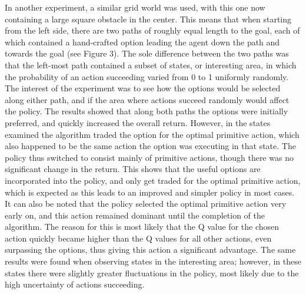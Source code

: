 \documentclass{acm_proc_article-sp}
\begin{document}
In another experiment, a similar grid world was used, with this one now containing a large square obstacle in the center. This means that when starting from the left side, there are two paths of roughly equal length to the goal, each of which contained a hand-crafted option leading the agent down the path and towards the goal (see Figure 3). The sole difference between the two paths was that the left-most path contained a subset of states, or interesting area, in which the probability of an action succeeding varied from 0 to 1 uniformly randomly.
	 The interest of the experiment was to see how the options would be selected along either path, and if the area where actions succeed randomly would affect the policy. The results showed that along both paths the options were initially preferred, and quickly increased the overall return. 
	 However, in the states examined the algorithm traded the option for the optimal primitive action, which also happened to be the same action the option was executing in that state. The policy thus switched to consist mainly of primitive actions, though there was no significant change in the return. This shows that the useful options are incorporated into the policy, and only get traded for the optimal primitive action, which is expected as this leads to an improved and simpler policy in most cases.
	  It can also be noted that the policy selected the optimal primitive action very early on, and this action remained dominant until the completion of the algorithm. The reason for this is most likely that the Q value for the chosen action quickly became higher than the Q values for all other actions, even surpassing the options, thus giving this action a significant advantage.
	  The same results were found when observing states in the interesting area; however, in these states there were slightly greater fluctuations in the policy, most likely due to the high uncertainty of actions succeeding.
	  
\end{document}
